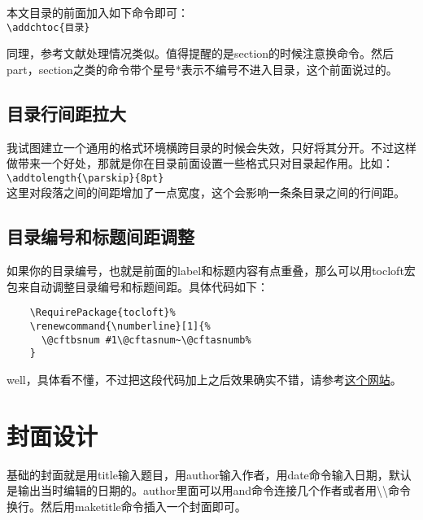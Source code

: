 \documentclass[11pt,oneside]{book}
\begin{document}
  本文目录的前面加入如下命令即可：\\
  \verb+\addchtoc{目录}+

  同理，参考文献处理情况类似。值得提醒的是section的时候注意换命令。然后part，section之类的命令带个星号*表示不编号不进入目录，这个前面说过的。

  \section{目录行间距拉大}
  我试图建立一个通用的格式环境横跨目录的时候会失效，只好将其分开。不过这样做带来一个好处，那就是你在目录前面设置一些格式只对目录起作用。比如：\\
  \verb+\addtolength{\parskip}{8pt}+\\
  这里对段落之间的间距增加了一点宽度，这个会影响一条条目录之间的行间距。


  \section{目录编号和标题间距调整}
  如果你的目录编号，也就是前面的label和标题内容有点重叠，那么可以用tocloft宏包来自动调整目录编号和标题间距。具体代码如下：
  \begin{Verbatim}
    \RequirePackage{tocloft}%
    \renewcommand{\numberline}[1]{%
      \@cftbsnum #1\@cftasnum~\@cftasnumb%
    }
  \end{Verbatim}

  well，具体看不懂，不过把这段代码加上之后效果确实不错，请参考\href{http://tex.stackexchange.com/questions/64115/table-of-contents-chapter-number-width}{这个网站}。




  \chapter{封面设计}
  基础的封面就是用title输入题目，用author输入作者，用date命令输入日期，默认是输出当时编辑的日期的。author里面可以用and命令连接几个作者或者用\textbackslash \textbackslash 命令换行。然后用maketitle命令插入一个封面即可。
\end{document}
